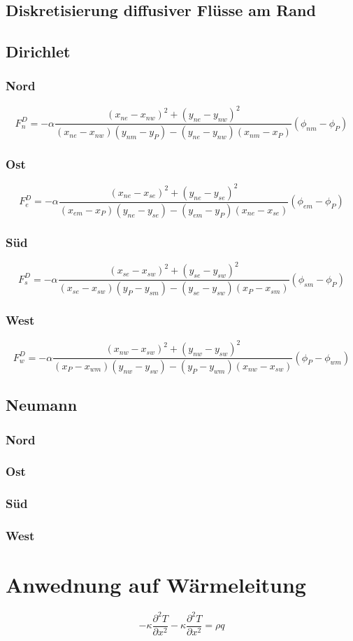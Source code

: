 \documentclass[10pt,a4paper]{article}
\begin{document}
\subsection{Diskretisierung diffusiver Flüsse am Rand}
\subsection{Dirichlet}
\subsubsection{Nord}
\begin{equation}
F_n^D = -\alpha \frac{(x_{ne}-x_{nw})^2+(y_{ne}-y_{nw})^2}{(x_{ne}-x_{nw})(y_{nm}-y_P)-(y_{ne}-y_{nw})(x_{nm}-x_P)}(\phi_{nm}-\phi_P)
\end{equation}
\subsubsection{Ost}
\begin{equation}
F_e^D = -\alpha \frac{(x_{ne}-x_{se})^2+(y_{ne}-y_{se})^2}{(x_{em}-x_P)(y_{ne}-y_{se})-(y_{em}-y_P)(x_{ne}-x_{se})}(\phi_{em}-\phi_P)
\end{equation}
\subsubsection{Süd}
\begin{equation}
F_s^D = -\alpha \frac{(x_{se}-x_{sw})^2+(y_{se}-y_{sw})^2}{(x_{se}-x_{sw})(y_P-y_{sm})-(y_{se}-y_{sw})(x_P-x_{sm})}(\phi_{sm}-\phi_P)
\end{equation}
\subsubsection{West}
\begin{equation}
F_w^D = -\alpha \frac{(x_{nw}-x_{sw})^2+(y_{nw}-y_{sw})^2}{(x_P-x_{wm})(y_{nw}-y_{sw})-(y_P-y_{wm})(x_{nw}-x_{sw})}(\phi_P-\phi_{wm})
\end{equation}
\subsection{Neumann}
\subsubsection{Nord}
\subsubsection{Ost}
\subsubsection{Süd}
\subsubsection{West}



\section{Anwednung auf Wärmeleitung}

\begin{equation}
-\kappa \frac{\partial^2 T}{\partial x^2} -\kappa \frac{\partial^2 T}{\partial x^2} = \rho q 
\end{equation}
\end{document}
